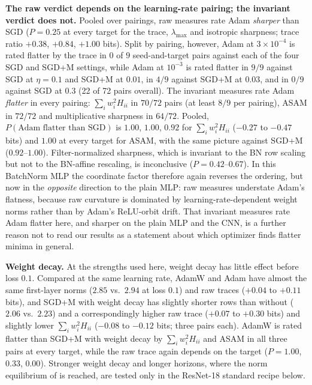 \documentclass[10pt]{article}
\theoremstyle{remark}
\begin{document}
\textbf{The raw verdict depends on the learning-rate pairing; the invariant verdict does not.} Pooled over pairings, raw measures rate Adam \emph{sharper} than SGD ($P=0.25$ at every target for the trace, $\lambda_{\max}$ and isotropic sharpness; trace ratio $+0.38$, $+0.84$, $+1.00$ bits). Split by pairing, however, Adam at $3\times10^{-4}$ is rated flatter by the trace in $0$ of $9$ seed-and-target pairs against each of the four SGD and SGD+M settings, while Adam at $10^{-3}$ is rated flatter in $9/9$ against SGD at $\eta=0.1$ and SGD+M at $0.01$, in $4/9$ against SGD+M at $0.03$, and in $0/9$ against SGD at $0.3$ (22 of 72 pairs overall). The invariant measures rate Adam \emph{flatter} in every pairing: $\sum_iw_i^2H_{ii}$ in $70/72$ pairs (at least $8/9$ per pairing), ASAM in $72/72$ and multiplicative sharpness in $64/72$. Pooled, $P(\text{Adam flatter than SGD})$ is $1.00$, $1.00$, $0.92$ for $\sum_iw_i^2H_{ii}$ ($-0.27$ to $-0.47$ bits) and $1.00$ at every target for ASAM, with the same picture against SGD+M ($0.92$--$1.00$). Filter-normalized sharpness, which is invariant to the BN row scaling but not to the BN-affine rescaling, is inconclusive ($P=0.42$--$0.67$). In this BatchNorm MLP the coordinate factor therefore again reverses the ordering, but now in the \emph{opposite} direction to the plain MLP: raw measures understate Adam's flatness, because raw curvature is dominated by learning-rate-dependent weight norms rather than by Adam's ReLU-orbit drift. That invariant measures rate Adam flatter here, and sharper on the plain MLP and the CNN, is a further reason not to read our results as a statement about which optimizer finds flatter minima in general.

\textbf{Weight decay.} At the strengths used here, weight decay has little effect before loss $0.1$. Compared at the same learning rate, AdamW and Adam have almost the same first-layer norms ($2.85$ vs.\ $2.94$ at loss $0.1$) and raw traces ($+0.04$ to $+0.11$ bits), and SGD+M with weight decay has slightly shorter rows than without ($2.06$ vs.\ $2.23$) and a correspondingly higher raw trace ($+0.07$ to $+0.30$ bits) and slightly lower $\sum_iw_i^2H_{ii}$ ($-0.08$ to $-0.12$ bits; three pairs each). AdamW is rated flatter than SGD+M with weight decay by $\sum_iw_i^2H_{ii}$ and ASAM in all three pairs at every target, while the raw trace again depends on the target ($P=1.00$, $0.33$, $0.00$). Stronger weight decay and longer horizons, where the norm equilibrium of \citet{vanlaarhoven2017l2} is reached, are tested only in the ResNet-18 standard recipe below.
\end{document}
